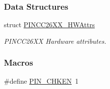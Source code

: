 \subsubsection*{Data Structures}
\begin{DoxyCompactItemize}
\item 
struct \hyperlink{struct_p_i_n_c_c26_x_x___h_w_attrs}{P\+I\+N\+C\+C26\+X\+X\+\_\+\+H\+W\+Attrs}
\begin{DoxyCompactList}\small\item\em P\+I\+N\+C\+C26\+X\+X Hardware attributes. \end{DoxyCompactList}\end{DoxyCompactItemize}
\subsubsection*{Macros}
\begin{DoxyCompactItemize}
\item 
\#define \hyperlink{_p_i_n_c_c26_x_x_8h_a62bc64a4f307af84ae177c2675de76a1}{P\+I\+N\+\_\+\+C\+H\+K\+E\+N}~1
\end{DoxyCompactItemize}
